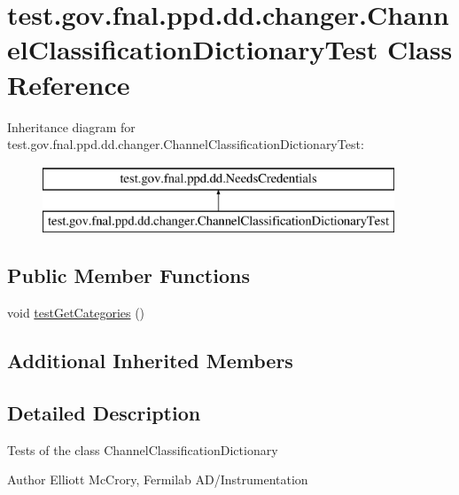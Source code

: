\hypertarget{classtest_1_1gov_1_1fnal_1_1ppd_1_1dd_1_1changer_1_1ChannelClassificationDictionaryTest}{\section{test.\-gov.\-fnal.\-ppd.\-dd.\-changer.\-Channel\-Classification\-Dictionary\-Test Class Reference}
\label{classtest_1_1gov_1_1fnal_1_1ppd_1_1dd_1_1changer_1_1ChannelClassificationDictionaryTest}
}
Inheritance diagram for test.\-gov.\-fnal.\-ppd.\-dd.\-changer.\-Channel\-Classification\-Dictionary\-Test\-:\begin{figure}[H]
\begin{center}
\leavevmode
\includegraphics[height=2.000000cm]{classtest_1_1gov_1_1fnal_1_1ppd_1_1dd_1_1changer_1_1ChannelClassificationDictionaryTest}
\end{center}
\end{figure}
\subsection*{Public Member Functions}
\begin{DoxyCompactItemize}
\item 
void \hyperlink{classtest_1_1gov_1_1fnal_1_1ppd_1_1dd_1_1changer_1_1ChannelClassificationDictionaryTest_a2c3396f83d17d27a31eefad2160e8686}{test\-Get\-Categories} ()
\end{DoxyCompactItemize}
\subsection*{Additional Inherited Members}


\subsection{Detailed Description}
Tests of the class Channel\-Classification\-Dictionary

\begin{DoxyAuthor}{Author}
Elliott Mc\-Crory, Fermilab A\-D/\-Instrumentation 
\end{DoxyAuthor}



